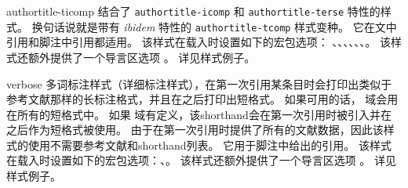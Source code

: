\begin{marglist}
\item[authortitle-ticomp]
结合了 \texttt{authortitle-icomp} 和 \texttt{authortitle-terse} 特性的样式。
换句话说就是带有 \emph{ibidem} 特性的 \texttt{authortitle-tcomp} 样式变种。
它在文中引用和脚注中引用都适用。
该样式在载入时设置如下的宏包选项：
、、、、、、。
该样式还额外提供了一个导言区选项 。
详见样式例子。

\item[verbose]
多词标注样式（详细标注样式），在第一次引用某条目时会打印出类似于参考文献那样的长标注格式，并且在之后打印出短格式。
如果可用的话， 域会用在所有的短格式中。
如果  域有定义，该shorthand会在第一次引用时被引入并在之后作为短格式被使用。
由于在第一次引用时提供了所有的文献数据，因此该样式的使用不需要参考文献和shorthand列表。
它用于脚注中给出的引用。
该样式在载入时设置如下的宏包选项：、。
该样式还额外提供了一个导言区选项 。
详见样式例子。


\end{marglist}
